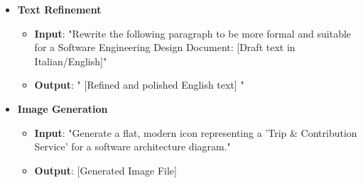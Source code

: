 \begin{itemize}
\begin{itemize}
\begin{itemize}
            \item \textbf{Output}: 
\begin{verbatim}
title SD1. Sign Up

actor User
participant "Client App" as App
participant "API Gateway" as GW
participant "Security Manager" as SM
participant "Profile Manager" as PM
participant "Mailing Service" as MS
database "Security DBMS" as SDB
database "Profiles DBMS" as PDB

== Registration Request ==
User->App: Click "Sign Up"
activate App
App->User: Show registration form
deactivate App
User->App: Insert email, password...
... [Rest of the generated code] ...
\end{verbatim}
        \end{itemize}

        \item \textbf{Text Refinement}
        \begin{itemize}
            \item \textbf{Input}: "Rewrite the following paragraph to be more formal and suitable for a Software Engineering Design Document: [Draft text in Italian/English]"
            \item \textbf{Output}: " [Refined and polished English text] "
        \end{itemize}
        
        \item \textbf{Image Generation}
        \begin{itemize}
            \item \textbf{Input}: "Generate a flat, modern icon representing a 'Trip & Contribution Service' for a software architecture diagram."
            \item \textbf{Output}: [Generated Image File]
        \end{itemize}

    \end{itemize}

\end{itemize}
